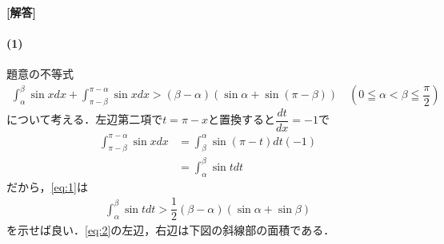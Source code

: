 \documentclass[../../main.tex]{subfiles}
\begin{document}
\begin{oframed}
  
\end{oframed}

{\bf [解答]}

\paragraph{(1)}

題意の不等式
\begin{align}
  \int_\alpha^\beta \sin xdx + \int_{\pi-\beta}^{\pi-\alpha} \sin xdx >
  (\beta-\alpha)(\sin\alpha+\sin(\pi-\beta))
  \quad  \left(0\leqq\alpha<\beta\leqq\dfrac{\pi}{2} \right) \label{eq:1}
\end{align}
について考える．左辺第二項で$t = \pi - x$と置換すると$\dfrac{dt}{dx} = -1$で
\begin{align}
  \int_{\pi-\beta}^{\pi-\alpha} \sin xdx
  & =  \int_\beta^\alpha \sin(\pi-t) dt (-1) \\
  & = \int_\alpha^\beta \sin t dt
\end{align}
だから，\cref{eq:1}は
\begin{align}
  \int_\alpha^\beta \sin t dt > \dfrac{1}{2}(\beta-\alpha)(\sin\alpha + \sin\beta) \label{eq:2}
\end{align}
を示せば良い．\cref{eq:2}の左辺，右辺は下図の斜線部の面積である．
\end{document}
